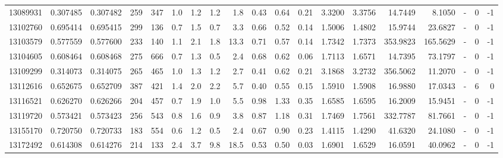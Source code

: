 \begin{tabular}{rrrrrrrrrrrrrrrrlrr}
  13089931 & 0.307485 &   0.307482 &  259 &  347 &      1.0 &      1.2 &     1.2 &      1.8 &       0.43 &        0.64 &        0.21 &  3.3200 &  3.3756 &   14.7449 &    8.1050 &             - &        0 &         -1 \\
  13102760 & 0.695414 &   0.695415 &  299 &  136 &      0.7 &      1.5 &     0.7 &      3.3 &       0.66 &        0.52 &        0.14 &  1.5006 &  1.4802 &   15.9744 &   23.6827 &             - &        0 &         -1 \\
  13103579 & 0.577559 &   0.577600 &  233 &  140 &      1.1 &      2.1 &     1.8 &     13.3 &       0.71 &        0.57 &        0.14 &  1.7342 &  1.7373 &  353.9823 &  165.5629 &             - &        0 &         -1 \\
  13104605 & 0.608464 &   0.608468 &  275 &  666 &      0.7 &      1.3 &     0.5 &      2.4 &       0.68 &        0.62 &        0.06 &  1.7113 &  1.6571 &   14.7395 &   73.1797 &             - &        0 &         -1 \\
  13109299 & 0.314073 &   0.314075 &  265 &  465 &      1.0 &      1.3 &     1.2 &      2.7 &       0.41 &        0.62 &        0.21 &  3.1868 &  3.2732 &  356.5062 &   11.2070 &             - &        0 &         -1 \\
  13112616 & 0.652675 &   0.652709 &  387 &  421 &      1.4 &      2.0 &     2.2 &      5.7 &       0.40 &        0.55 &        0.15 &  1.5910 &  1.5908 &   16.9880 &   17.0343 &             - &        6 &          0 \\
  13116521 & 0.626270 &   0.626266 &  204 &  457 &      0.7 &      1.9 &     1.0 &      5.5 &       0.98 &        1.33 &        0.35 &  1.6585 &  1.6595 &   16.2009 &   15.9451 &             - &        0 &         -1 \\
  13119720 & 0.573421 &   0.573423 &  256 &  543 &      0.8 &      1.6 &     0.9 &      3.8 &       0.87 &        1.18 &        0.31 &  1.7469 &  1.7561 &  332.7787 &   81.7661 &             - &        0 &         -1 \\
  13155170 & 0.720750 &   0.720733 &  183 &  554 &      0.6 &      1.2 &     0.5 &      2.4 &       0.67 &        0.90 &        0.23 &  1.4115 &  1.4290 &   41.6320 &   24.1080 &             - &        0 &         -1 \\
  13172492 & 0.614308 &   0.614276 &  214 &  133 &      2.4 &      3.7 &     9.8 &     18.5 &       0.53 &        0.50 &        0.03 &  1.6901 &  1.6529 &   16.0591 &   40.0962 &             - &        0 &         -1 \\

\end{tabular}
